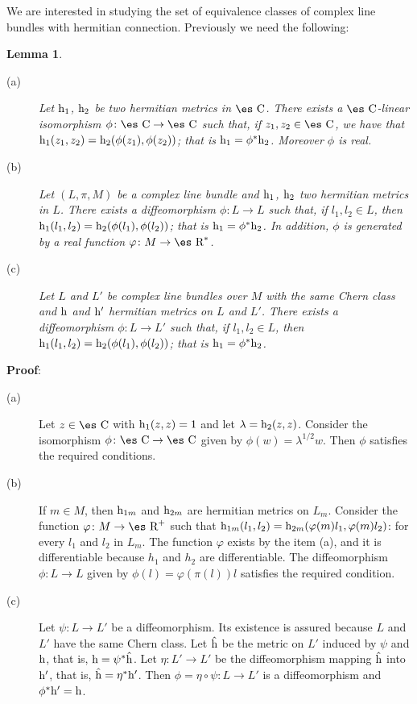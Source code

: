 \documentclass[12pt]{article}
\newtheorem{lem}{Lemma}
\def\qed{\ifvmode\removelastskip\fi
{\unskip\nobreak\hfil\penalty50\hbox{}\nobreak\hfil
\hbox{\vrule height1.2ex width1.2ex}\parfillskip=0pt
\finalhyphendemerits=0 \par\smallskip}}
\def\h{{\rm h}}
\def\Real{\mbox{\es R}}
\def\Complex{\mbox{\es C}}
\begin{document}
We are interested in studying the set of
equivalence classes of complex line bundles with hermitian connection.
Previously we need the following:

\begin{lem}
\begin{description}
\item[{\rm (a)}]
Let $\h_1$, $\h_2$ be
two hermitian metrics in $\Complex$.
There exists a $\Complex$-linear isomorphism
$\phi \colon \Complex \to \Complex$
such that, if $z_1,z_2 \in \Complex$,
we have that $\h_1(z_1,z_2) = \h_2(\phi (z_1),\phi (z_2))$;
that is $\h_1 = \phi^*\h_2$.
Moreover $\phi$ is real.
\item[{\rm (b)}]
Let $(L,\pi ,M)$ be a complex line bundle
and $\h_1$, $\h_2$
two hermitian metrics in $L$.
There exists a diffeomorphism
$\phi \colon L \to L$
such that, if $l_1,l_2 \in L$,
then $\h_1(l_1,l_2) = \h_2(\phi (l_1),\phi (l_2))$;
that is $\h_1 = \phi^*\h_2$.
In addition, $\phi$ is generated by a real function
$\varphi \colon M \to \Real^*$.
\item[{\rm (c)}]
Let $L$ and $L'$ be complex line bundles over $M$
with the same Chern class and $\h$ and $\h '$
hermitian metrics on $L$ and $L'$.
There exists a diffeomorphism $\phi \colon L \to L'$
such that, if $l_1,l_2 \in L$,
then $\h_1(l_1,l_2) = \h_2(\phi (l_1),\phi (l_2))$;
that is $\h_1 = \phi^*\h_2$.
\end{description}
\end{lem}
{\bf Proof}: 
\begin{description}
\item[{\rm (a)}]
Let $z \in \Complex$ with $\h_1(z,z)=1$
and let $\lambda = \h_2(z,z)$.
Consider the isomorphism $\phi \colon \Complex \to \Complex$
given by $\phi (w) = \lambda^{1/2}w$.
Then $\phi$ satisfies the required conditions.
\item[{\rm (b)}]
If $m \in M$, then $\h_{1m}$ and $\h_{2m}$
are hermitian metrics on $L_m$.
Consider the function $\varphi \colon M \to \Real^+$ such that
$\h_{1m}(l_1,l_2) = \h_{2m}(\varphi (m)l_1,\varphi (m)l_2)$:
for every $l_1$ and $l_2$ in $L_m$. The function $\varphi$ exists
by the item (a), and it is differentiable because $h_1$ and $h_2$ are
differentiable.
The diffeomorphism $\phi \colon L \to L$ given by
$\phi (l) = \varphi (\pi (l))l$ satisfies the required condition.
\item[{\rm (c)}]
Let $\psi \colon L \to L'$ be a diffeomorphism.
Its existence is assured because $L$ and $L'$
have the same Chern class.
Let $\hat \h$ be the metric on $L'$ induced by $\psi$ and $\h$,
that is, $\h = \psi^* \hat \h$.
Let $\eta \colon L' \to L'$ be the diffeomorphism
mapping $\hat \h$ into $\h '$, that is,
$\hat \h = \eta ^* \h '$.
Then $\phi = \eta \circ \psi \colon L \to L'$
is a diffeomorphism and $\phi^* \h ' = \h$.
\end{description}
\qed
\end{document}
